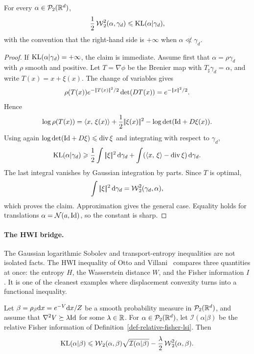\begin{prop}\label{prop-gaussian-talagrand-t2}
	For every $\alpha\in\mathcal{P}_2(\mathbb{R}^d)$,
	\[
		\frac12\operatorname{\mathcal{W}}_2^2(\alpha,\gamma_d)
		\leqslant
		\operatorname{KL}(\alpha|\gamma_d),
	\]
	with the convention that the right-hand side is \(+\infty\) when \(\alpha\not\ll\gamma_d\).
\end{prop}

\begin{proof}
	If \(\operatorname{KL}(\alpha|\gamma_d)=+\infty\), the claim is immediate. Assume first that \(\alpha=\rho\gamma_d\) with \(\rho\) smooth and positive. Let $T=\nabla\phi$ be the Brenier map with $T_\sharp\gamma_d=\alpha$, and write $T(x)=x+\xi(x)$. The change of variables gives
	\[
		\rho(T(x))e^{-|\!| T(x) |\!|^2/2}\det(DT(x))
		=
		e^{-|\!| x |\!|^2/2}.
	\]
	Hence
	\[
		\log \rho(T(x))
		=
		\langle x,\,\xi(x)\rangle
		+
		\frac12|\!| \xi(x) |\!|^2
		-
		\log\det(\mathrm{Id}+D\xi(x)).
	\]
	Using again $\log\det(\mathrm{Id}+D\xi)\leqslant\operatorname{div}\xi$ and integrating with respect to $\gamma_d$,
	\[
		\operatorname{KL}(\alpha|\gamma_d)
		\geqslant
		\frac12\int|\!| \xi |\!|^2\,\mathrm{d}\gamma_d
		+
		\int(\langle x,\,\xi\rangle-\operatorname{div}\xi)\,\mathrm{d}\gamma_d.
	\]
	The last integral vanishes by Gaussian integration by parts. Since $T$ is optimal,
	\[
		\int|\!| \xi |\!|^2\,\mathrm{d}\gamma_d=\operatorname{\mathcal{W}}_2^2(\gamma_d,\alpha),
	\]
	which proves the claim. Approximation gives the general case. Equality holds for translations \(\alpha=\mathcal{N}(a,\mathrm{Id})\), so the constant is sharp.
\end{proof}

\paragraph{The HWI bridge.}
The Gaussian logarithmic Sobolev and transport-entropy inequalities are not isolated facts. The HWI inequality of Otto and Villani~\cite{OttoVillani2000Generalization} compares three quantities at once: the entropy \(H\), the Wasserstein distance \(W\), and the Fisher information \(I\). It is one of the cleanest examples where displacement convexity turns into a functional inequality.

\begin{prop}\label{prop-hwi-inequality}
	Let $\beta=\rho_\beta\mathrm{d} x=e^{-V}\mathrm{d} x/Z$ be a smooth probability measure in $\mathcal{P}_2(\mathbb{R}^d)$, and assume that $\nabla^2 V\succeq \lambda \mathrm{Id}$ for some $\lambda\in\mathbb{R}$. For $\alpha\in\mathcal{P}_2(\mathbb{R}^d)$, let $\mathcal I(\alpha|\beta)$ be the relative Fisher information of Definition~\ref{def-relative-fisher-lsi}. Then
	\[
		\operatorname{KL}(\alpha|\beta)
		\leqslant
		\operatorname{\mathcal{W}}_2(\alpha,\beta)\sqrt{\mathcal I(\alpha|\beta)}
		-\frac{\lambda}{2}\operatorname{\mathcal{W}}_2^2(\alpha,\beta).
	\]
\end{prop}

